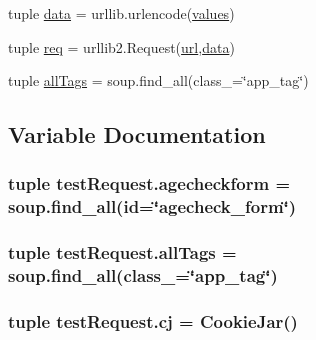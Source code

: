 \begin{DoxyCompactItemize}
\item 
tuple \hyperlink{namespacetest_request_aa2da30dcafd8fe42c8408aba77c7e70f}{data} = urllib.\+urlencode(\hyperlink{namespacetest_request_ad045126755bc1baa0a4cacb58d77b4a1}{values})
\item 
tuple \hyperlink{namespacetest_request_a5db18cf7ac0523c1940da68f3301fc49}{req} = urllib2.\+Request(\hyperlink{namespacetest_request_a503c8624234f46b468f9d0b807d63cb0}{url},\hyperlink{namespacetest_request_aa2da30dcafd8fe42c8408aba77c7e70f}{data})
\item 
tuple \hyperlink{namespacetest_request_a52e13bffa1978df832b6676e9e492fe0}{all\+Tags} = soup.\+find\+\_\+all(class\+\_\+=\char`\"{}app\+\_\+tag\char`\"{})
\end{DoxyCompactItemize}


\subsection{Variable Documentation}
\hypertarget{namespacetest_request_a577a66202d87bdc38bab9969bd0b0be8}{
\subsubsection[{agecheckform}]{\setlength{\rightskip}{0pt plus 5cm}tuple test\+Request.\+agecheckform = soup.\+find\+\_\+all(id=\char`\"{}agecheck\+\_\+form\char`\"{})}}\label{namespacetest_request_a577a66202d87bdc38bab9969bd0b0be8}
\hypertarget{namespacetest_request_a52e13bffa1978df832b6676e9e492fe0}{
\subsubsection[{all\+Tags}]{\setlength{\rightskip}{0pt plus 5cm}tuple test\+Request.\+all\+Tags = soup.\+find\+\_\+all(class\+\_\+=\char`\"{}app\+\_\+tag\char`\"{})}}\label{namespacetest_request_a52e13bffa1978df832b6676e9e492fe0}
\hypertarget{namespacetest_request_afd477347e61eaf087de75394b8249088}{
\subsubsection[{cj}]{\setlength{\rightskip}{0pt plus 5cm}tuple test\+Request.\+cj = Cookie\+Jar()}}\label{namespacetest_request_afd477347e61eaf087de75394b8249088}
